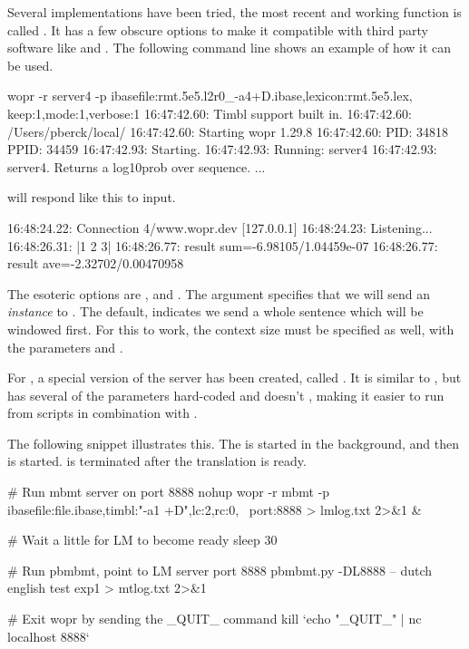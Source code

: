 \documentclass[a4paper,10pt,twoside]{report}
\begin{document}
Several implementations have been tried, the most recent and working
function is called . It has a few obscure options to make
it compatible with third party software like  and
\pbmbmt{}. The following command line shows an example of how it
can be used.

\begin{bash}{}

wopr -r server4 -p ibasefile:rmt.5e5.l2r0_-a4+D.ibase,lexicon:rmt.5e5.lex,
                   keep:1,mode:1,verbose:1
16:47:42.60: Timbl support built in.
16:47:42.60: /Users/pberck/local/
16:47:42.60: Starting wopr 1.29.8
16:47:42.60: PID:  34818 PPID:  34459
16:47:42.93: Starting.
16:47:42.93: Running: server4
16:47:42.93: server4. Returns a log10prob over sequence.
...
\end{bash}

\Wopr{} will respond like this to input.

\begin{wout}{}
16:48:24.22: Connection 4/www.wopr.dev [127.0.0.1]
16:48:24.23: Listening...
16:48:26.31: |1 2 3|
16:48:26.77: result sum=-6.98105/1.04459e-07
16:48:26.77: result ave=-2.32702/0.00470958
\end{wout}

The esoteric options are , and . The 
argument specifies that we will send an \emph{instance} to
\wopr{}. The default,  indicates we send a whole sentence
which will be windowed first. For this to work, the context size must
be specified as well, with the parameters  and .

For \pbmbmt{}, a special version of the server has been created,
called . It is similar to , but has several of
the parameters hard-coded and doesn't , making it easier to
run from scripts in combination with \pbmbmt{}.

The following snippet illustrates this. The \wopr{} \lm{} is started
in the background, and then \pbmbmt{} is started. \Wopr{} is
terminated after the translation is ready.

\begin{bash}{}
# Run mbmt server on port 8888
nohup wopr -r mbmt -p ibasefile:file.ibase,timbl:"-a1 +D",lc:2,rc:0, \
    port:8888 > lmlog.txt 2>&1 &

# Wait a little for LM to become ready
sleep 30

# Run pbmbmt, point to LM server port 8888
pbmbmt.py -DL8888 -- dutch english test exp1 > mtlog.txt 2>&1

# Exit wopr by sending the _QUIT_ command 
kill `echo "_QUIT_" | nc localhost 8888`
\end{bash}
\end{document}
